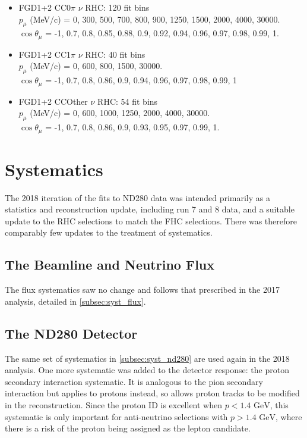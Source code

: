 \begin{itemize}
	\item FGD1+2 CC0$\pi$ $\nu$ RHC: 120 fit bins \\
	$p_\mu$ (MeV/c) = 0, 300, 500, 700, 800, 900, 1250, 1500, 2000, 4000, 30000.\\
	$\cos\theta_\mu$ = -1, 0.7, 0.8, 0.85, 0.88, 0.9, 0.92, 0.94, 0.96, 0.97, 0.98, 0.99, 1.
	
	\item FGD1+2 CC1$\pi$ $\nu$ RHC: 40 fit bins \\
	$p_\mu$ (MeV/c) = 0, 600, 800, 1500, 30000.\\
	$\cos\theta_\mu$ = -1, 0.7, 0.8, 0.86, 0.9, 0.94, 0.96, 0.97, 0.98, 0.99, 1
	
	\item FGD1+2 CCOther $\nu$ RHC: 54 fit bins \\
	$p_\mu$ (MeV/c) = 0, 600, 1000, 1250, 2000, 4000, 30000.\\
	$\cos\theta_\mu$ = -1, 0.7, 0.8, 0.86, 0.9, 0.93, 0.95, 0.97, 0.99, 1.
\end{itemize}

\section{Systematics}
\label{sec:syst_2018}
The 2018 iteration of the fits to ND280 data was intended primarily as a statistics and reconstruction update, including run 7 and 8 data, and a suitable update to the RHC selections to match the FHC selections. There was therefore comparably few updates to the treatment of systematics.

\subsection{The Beamline and Neutrino Flux}
The flux systematics saw no change and follows that prescribed in the 2017 analysis, detailed in  \autoref{subsec:syst_flux}.

\subsection{The ND280 Detector}
The same set of systematics in \autoref{subsec:syst_nd280} are used again in the 2018 analysis. One more systematic was added to the detector response: the proton secondary interaction systematic. It is analogous to the pion secondary interaction but applies to protons instead, so allows proton tracks to be modified in the reconstruction. Since the proton ID is excellent when $p < 1.4\text{ GeV}$, this systematic is only important for anti-neutrino selections with $p > 1.4\text{ GeV}$, where there is a risk of the proton being assigned as the lepton candidate.

